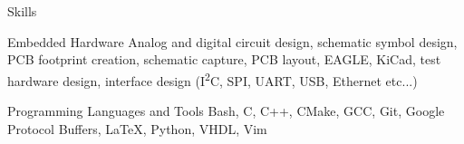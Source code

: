 

\section{\faToolbox}{Skills}

 \resumeEntryStart
  \resumeEntryS
	{Embedded Hardware}
	{
     Analog and digital circuit design, schematic symbol design, PCB footprint
     creation, schematic capture, PCB layout, EAGLE, KiCad, test hardware
     design, interface design (I\textsuperscript{2}C, SPI, UART, USB, Ethernet
     etc...)
	}

  \resumeEntryS
	{Programming Languages and Tools}
	{
     Bash, C, C++, CMake, GCC, Git, Google Protocol Buffers, \LaTeX, Python, VHDL, Vim
	}

  \vspace{5pt}
 \resumeEntryEnd
